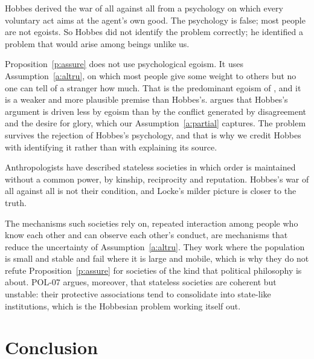 \documentclass{situationist-preprint}
\begin{document}
\begin{objection}
Hobbes derived the war of all against all from a psychology on which every voluntary act aims at the agent's own good. The psychology is false; most people are not egoists. So Hobbes did not identify the problem correctly; he identified a problem that would arise among beings unlike us.
\end{objection}

\begin{reply}
Proposition~\ref{p:assure} does not use psychological egoism. It uses Assumption~\ref{a:altru}, on which most people give some weight to others but no one can tell of a stranger how much. That is the predominant egoism of \citet{Kavka1986}, and it is a weaker and more plausible premise than Hobbes's. \citet{Hampton1986} argues that Hobbes's argument is driven less by egoism than by the conflict generated by disagreement and the desire for glory, which our Assumption~\ref{a:partial} captures. The problem survives the rejection of Hobbes's psychology, and that is why we credit Hobbes with identifying it rather than with explaining its source.
\end{reply}

\begin{objection}
Anthropologists have described stateless societies in which order is maintained without a common power, by kinship, reciprocity and reputation. Hobbes's war of all against all is not their condition, and Locke's milder picture is closer to the truth.
\end{objection}

\begin{reply}
The mechanisms such societies rely on, repeated interaction among people who know each other and can observe each other's conduct, are mechanisms that reduce the uncertainty of Assumption~\ref{a:altru}. They work where the population is small and stable and fail where it is large and mobile, which is why they do not refute Proposition~\ref{p:assure} for societies of the kind that political philosophy is about. POL-07 argues, moreover, that stateless societies are coherent but unstable: their protective associations tend to consolidate into state-like institutions, which is the Hobbesian problem working itself out.
\end{reply}

\section{Conclusion}
\end{document}
